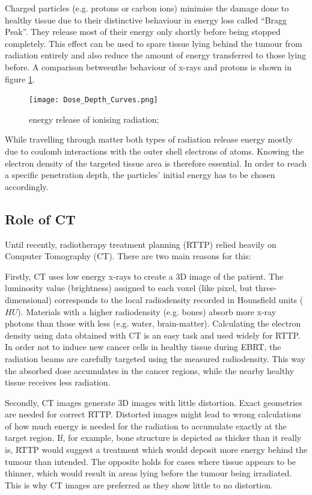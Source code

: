 Charged particles (e.g. protons or carbon ions) minimise the damage done to healthy tissue due to their distinctive behaviour in energy loss called ``Bragg Peak''.
They release most of their energy only shortly before being stopped completely.
\cite{Nakamura2010} This effect can be used to spare tissue lying behind the tumour from radiation entirely and also reduce the amount of energy transferred to those lying before. \cite{Paganetti2005}
A comparison betweenthe behaviour of x-rays and protons is shown in figure \ref{fig:bragg}.

\begin{figure}[!h]
	\centering
	\texttt{[image: Dose\_Depth\_Curves.png]}
	\caption{energy release of ionising radiation; \cite{Cepheiden}}
	\label{fig:bragg}
\end{figure}

While travelling through matter both types of radiation release energy mostly due to coulomb interactions with the outer shell electrons of atoms.
Knowing the electron density of the targeted tissue area is therefore essential.
In order to reach a specific penetration depth, the particles' initial energy has to be chosen accordingly.

\clearpage
\subsection{Role of CT}
Until recently, radiotherapy treatment planning (RTTP) relied heavily on Computer Tomography (CT).
There are two main reasons for this:

Firstly, CT uses low energy x-rays to create a 3D image of the patient.
The luminosity value (brightness) assigned to each voxel (like pixel, but three-dimensional) corresponds to the local radiodensity recorded in Hounsfield units ($HU$).
Materials with a higher radiodensity (e.g. bones) absorb more x-ray photons than those with less (e.g. water, brain-matter).
Calculating the electron density using data obtained with CT is an easy task and used widely for RTTP. \cite{Constantinou2012, Schneider1996}
In order not to induce new cancer cells in healthy tissue during EBRT, the radiation beams are carefully targeted using the measured radiodensity. 
This way the absorbed dose accumulates in the cancer regions, while the nearby healthy tissue receives less radiation.

Secondly, CT images generate 3D images with little distortion. Exact geometries are needed for correct RTTP.
Distorted images might lead to wrong calculations of how much energy is needed for the radiation to accumulate exactly at the target region.
If, for example, bone structure is depicted as thicker than it really is, RTTP would suggest a treatment which would deposit more energy behind the tumour than intended. The opposite holds for cases where tissue appears to be thinner, which would result in areas lying before the tumour being irradiated.
This is why CT images are preferred as they show little to no distortion.

